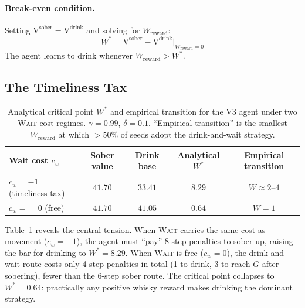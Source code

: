 \documentclass[manuscript, screen, review]{jair}
\newcommand{\wstar}{W^*}
\newcommand{\WV}[1]{\mathrm{V}^{#1}}     %
\begin{document}
\paragraph{Break-even condition.}
Setting $\WV{\mathrm{sober}} = \WV{\mathrm{drink}}$ and solving for
$W_{\mathrm{reward}}$:
\begin{equation}
  \wstar = \WV{\mathrm{sober}} - \WV{\mathrm{drink}}\big|_{W_{\mathrm{reward}}=0}
  \label{eq:wstar}
\end{equation}
The agent learns to drink whenever $W_{\mathrm{reward}} > \wstar$.

\subsection{The Timeliness Tax}

\begin{table}[t]
\centering
\caption{Analytical critical point $W^*$ and empirical transition for the
V3 agent under two \textsc{Wait} cost regimes.
$\gamma = 0.99$, $\delta = 0.1$.
``Empirical transition'' is the smallest $W_{\mathrm{reward}}$ at which
$>50\%$ of seeds adopt the drink-and-wait strategy.}
\label{tab:critical}
\begin{tabular}{lcccc}
\toprule
\textbf{Wait cost $c_w$} & \textbf{Sober value} & \textbf{Drink base} & \textbf{Analytical $W^*$} & \textbf{Empirical transition} \\
\midrule
$c_w = -1$ (timeliness tax)  & $41.70$ & $33.41$ & $8.29$ & $W \approx 2$--$4$ \\
$c_w = \phantom{-}0$ (free)  & $41.70$ & $41.05$ & $0.64$ & $W = 1$ \\
\bottomrule
\end{tabular}
\end{table}

Table~\ref{tab:critical} reveals the central tension.
When \textsc{Wait} carries the same cost as movement ($c_w = -1$), the agent
must ``pay'' 8 step-penalties to sober up, raising the bar for drinking to
$W^* = 8.29$.
When \textsc{Wait} is free ($c_w = 0$), the drink-and-wait route costs only
4 step-penalties in total (1 to drink, 3 to reach $G$ after sobering), fewer
than the 6-step sober route.
The critical point collapses to $W^* = 0.64$: practically any positive
whisky reward makes drinking the dominant strategy.
\end{document}
